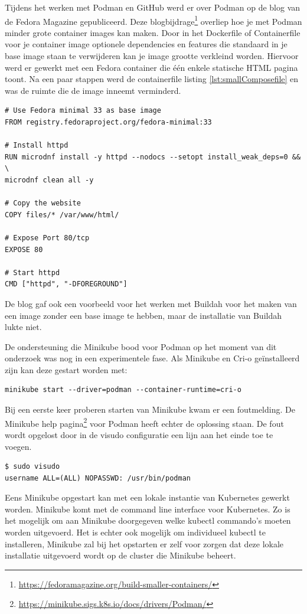 Tijdens het werken met Podman en GitHub werd er over Podman op de blog van de Fedora Magazine gepubliceerd. Deze blogbijdrage\footnote{\url{https://fedoramagazine.org/build-smaller-containers/}} overliep hoe je met Podman minder grote container images kan maken. Door in het Dockerfile of Containerfile voor je container image optionele dependencies en features die standaard in je base image staan te verwijderen kan je image grootte verkleind worden. Hiervoor werd er gewerkt met een Fedora container die één enkele statische HTML pagina toont. Na een paar stappen werd de containerfile listing \ref{lst:smallComposefile} en was de ruimte die de image inneemt verminderd.
\begin{lstlisting}[caption=inhoud van een containerfile die door een kleinere base en het weglaten van dependencies minder ruimte inneemt,label=lst:smallComposefile]
# Use Fedora minimal 33 as base image
FROM registry.fedoraproject.org/fedora-minimal:33

# Install httpd
RUN microdnf install -y httpd --nodocs --setopt install_weak_deps=0 && \
microdnf clean all -y

# Copy the website
COPY files/* /var/www/html/

# Expose Port 80/tcp
EXPOSE 80

# Start httpd
CMD ["httpd", "-DFOREGROUND"]
\end{lstlisting}

De blog gaf ook een voorbeeld voor het werken met Buildah voor het maken van een image zonder een base image te hebben, maar de installatie van Buildah lukte niet.

De ondersteuning die Minikube bood voor Podman op het moment van dit onderzoek was nog in een experimentele fase. Als Minikube en Cri-o geïnstalleerd zijn kan deze gestart worden met:
\begin{verbatim}
minikube start --driver=podman --container-runtime=cri-o
\end{verbatim}
Bij een eerste keer proberen starten van Minikube kwam er een foutmelding. De Minikube help pagina\footnote{\url{https://minikube.sigs.k8s.io/docs/drivers/Podman/}} voor Podman heeft echter de oplossing staan. De fout wordt opgelost door in de visudo configuratie een lijn aan het einde toe te voegen.
\begin{verbatim}
$ sudo visudo
username ALL=(ALL) NOPASSWD: /usr/bin/podman
\end{verbatim}

Eens Minikube opgestart kan met een lokale instantie van Kubernetes gewerkt worden. Minikube komt met de command line interface voor Kubernetes. Zo is het mogelijk om aan Minikube doorgegeven welke kubectl commando’s moeten worden uitgevoerd. Het is echter ook mogelijk om individueel kubectl te installeren, Minikube zal bij het opstarten er zelf voor zorgen dat deze lokale installatie uitgevoerd wordt op de cluster die Minikube beheert.

